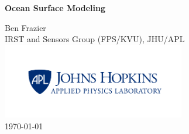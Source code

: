 \documentclass[12pt]{../packages/thesis}  %
\numberwithin{equation}{chapter}
\renewcommand{\baselinestretch}{2}
\begin{document}
\titlepage
\begin{center}
\vspace*{25pt}
{\huge \bfseries Ocean Surface Modeling\\}

\vspace{150 pt}

\large Ben Frazier \\
 \small IRST and Sensors Group (FPS/KVU), JHU/APL \\
\includegraphics[width=0.6\textwidth]{../media/apl_small_horizontal_blue} \\
\vspace{125pt}
\large \today
\end{center}

\renewcommand{\baselinestretch}{1}
\small\normalsize
\tableofcontents %
\newpage
\listoffigures %
\newpage



\setcounter{page}{1}

\renewcommand{\thechapter}{1}


\newpage
 

\end{document}
